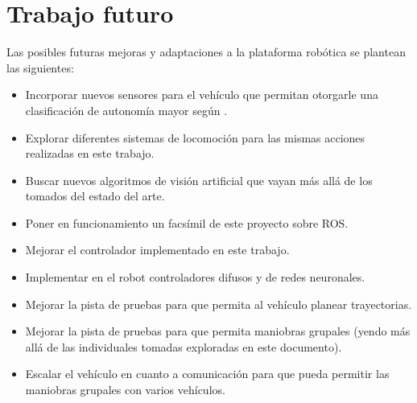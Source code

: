\section{Trabajo futuro}
\label{sec:trafut}
Las posibles futuras mejoras y adaptaciones a la plataforma robótica se plantean las siguientes:
\begin{itemize}
	\item Incorporar nuevos sensores para el vehículo que permitan otorgarle una clasificación de autonomía mayor según \cite{saeTaxonomyDefinitiosTerms2014}.
	\item Explorar diferentes sistemas de locomoción para las mismas acciones realizadas en este trabajo.
	\item Buscar nuevos algoritmos de visión artificial que vayan más allá de los tomados del estado del arte.
	\item Poner en funcionamiento un facsímil de este proyecto sobre ROS.
	\item Mejorar el controlador implementado en este trabajo.
	\item Implementar en el robot controladores difusos y de redes neuronales.
	\item Mejorar la pista de pruebas para que permita al vehículo planear trayectorias.
	\item Mejorar la pista de pruebas para que permita maniobras grupales (yendo más allá de las individuales tomadas exploradas en este documento).
	\item Escalar el vehículo en cuanto a comunicación para que pueda permitir las maniobras grupales con varios vehículos.
\end{itemize}